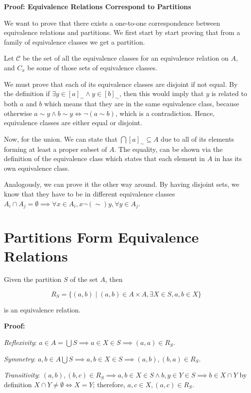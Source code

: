 \textbf{Proof: Equivalence Relations Correspond to Partitions}

We want to prove that there exists a one-to-one correspondence between equivalence relations and
partitions. We first start by start proving that from a family of equivalence classes we get a partition.

Let \(\mathscr{C}\) be the set of all the equivalence classes for an equivalence relation on \(A\), and
\(C_x\) be some of those sets of equivalence classes.

We must prove that each of its equivalence classes are disjoint if not equal. By the definition
if \(\exists y \in [a]_{\sim} \land y \in [b]_{\sim}\), then this would imply that \(y\) is related to both
\(a\) and \(b\) which means that they are in the same equivalence class, because otherwise \(a \sim y \land b \sim y \iff \neg (a \sim b)\), which
is a contradiction. Hence, equivalence classes are either equal or disjoint.

Now, for the union. We can state that \(\bigcap [a]_{\sim} \subseteq A\) due to all of its elements
forming at least a proper subset of \(A\). The equality, can be shown via the definition of the equivalence class which
states that each element in \(A\) in has its own equivalence class.

Analogously, we can prove it the other way around. By having disjoint sets, we know that they have to be
in different equivalence classes \(A_i \cap A_j = \emptyset \implies \forall x \in A_i, x \neg(\sim) y, \forall y \in A_j\).

\QED

\section{Partitions Form Equivalence Relations}

Given the partition \(S\) of the set \(A\), then

\[
	R_S = \{(a, b) \mid (a, b) \in A \times A, \exists X \in S, a,b \in X\}
\]

is an equivalence relation.

\textbf{Proof:}

\emph{Reflexivity}: \(a \in A = \bigcup S \implies a \in X \in S \implies (a, a) \in R_S\).

\emph{Symmetry}: \(a, b \in A \bigcup S \implies a,b \in X \in S \implies (a, b), (b, a) \in R_S\).

\emph{Transitivity}: \((a, b), (b, c) \in R_S \implies a,b \in X \in S \land b,y \in Y \in S \implies b \in X \cap Y\) by definition
\(X \cap Y \neq \emptyset \iff X = Y\); therefore, \(a, c \in X, (a, c) \in R_S\).

